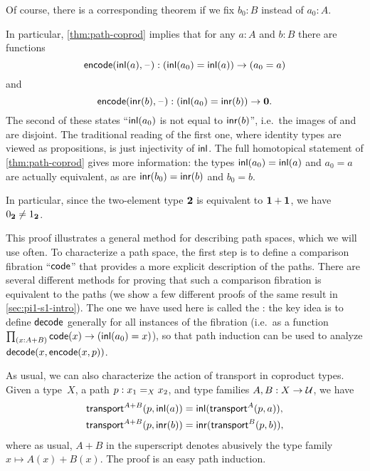 
\noindent
Of course, there is a corresponding theorem if we fix $b_0:B$ instead of $a_0:A$.

In particular, \autoref{thm:path-coprod} implies that for any $a : A$ and $b : B$ there are functions
%
\[ \encode(\inl(a), {\blank}) : (\inl(a_0)=\inl(a)) \to (a_0=a)\]
%
and
%
\[ \encode(\inr(b), {\blank}) : (\inl(a_0)=\inr(b)) \to \emptyt. \]
%
The second of these states
``$\inl(a_0)$ is not equal to $\inr(b)$'', i.e.\ the images of \inl and \inr are disjoint. The traditional reading of the first one, where identity types are viewed as propositions, is just injectivity of $\inl$.  The
full homotopical statement of \autoref{thm:path-coprod} gives more information: the types $\inl(a_0)=\inl(a)$ and
$a_0=a$ are actually equivalent, as are $\inr(b_0)=\inr(b)$ and $b_0=b$.

\begin{rmk}\label{rmk:true-neq-false}
In particular, since the two-element type $\bool$ is equivalent to $\unit+\unit$, we have $\bfalse\neq\btrue$.
\end{rmk}

This proof illustrates a general method for describing path spaces, which we will use often.  To characterize a path space, the first step is to define a comparison fibration ``$\code$'' that provides a more explicit description of the paths.  There are several different methods for proving that such a comparison fibration is equivalent to the paths (we show a few different proofs of the same result in \autoref{sec:pi1-s1-intro}).  The one we have used here is called the :
the key idea is to define $\decode$ generally for all instances of the fibration (i.e.\ as a function $\prd{x:A+B} \code(x) \to (\inl(a_0)=x)$), so that path induction can be used to analyze $\decode(x,\encode(x,p))$.  

%
As usual, we can also characterize the action of transport in coproduct types.
Given a type~$X$, a path $p:\id[X]{x_1}{x_2}$, and type families $A,B:X\to\type$, we have
\begin{align*}
  \transfib{A+B}{p}{\inl(a)} &= \inl (\transfib{A}{p}{a}),\\
  \transfib{A+B}{p}{\inr(b)} &= \inr (\transfib{B}{p}{b}),
\end{align*}
where as usual, $A+B$ in the superscript denotes abusively the type family $x\mapsto A(x)+B(x)$.
The proof is an easy path induction.

%
%

